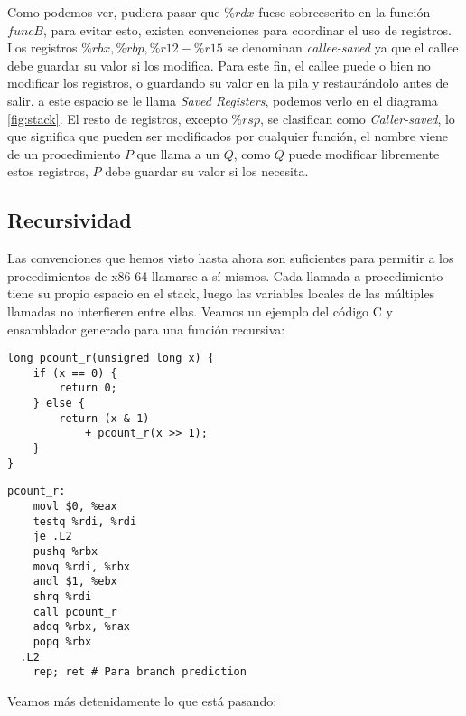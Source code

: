 Como podemos ver, pudiera pasar que $\%rdx$ fuese sobreescrito en la función $funcB$, para evitar esto,
existen convenciones para coordinar el uso de registros.
Los registros $\%rbx, \%rbp, \%r12-\%r15$ se denominan \textit{callee-saved} ya que el callee debe guardar su valor si los modifica.
Para este fin, el callee puede o bien no modificar los registros, o guardando su valor en la pila y restaurándolo antes de salir, a este espacio se le llama
\textit{Saved Registers}, podemos verlo en el diagrama \ref{fig:stack}.
El resto de registros, excepto $\%rsp$, se clasifican como \textit{Caller-saved}, lo que
significa que pueden ser modificados por cualquier función, el nombre viene de un procedimiento $P$ que llama a un $Q$, como
$Q$ puede modificar libremente estos registros, $P$ debe guardar su valor si los necesita.
\subsection{Recursividad}
Las convenciones que hemos visto hasta ahora son suficientes para permitir a los procedimientos de x86-64 llamarse a sí mismos.
Cada llamada a procedimiento tiene su propio espacio en el stack, luego las variables locales de las múltiples llamadas no interfieren entre ellas.
Veamos un ejemplo del código C y ensamblador generado para una función recursiva:
\begin{center}
	\begin{minipage}{0.45\textwidth}
		\begin{verbatim}
long pcount_r(unsigned long x) {
    if (x == 0) {
        return 0;
    } else {
        return (x & 1) 
            + pcount_r(x >> 1);
    }
}
\end{verbatim}
	\end{minipage}
	\begin{minipage}{0.45\textwidth}
		\begin{verbatim}
pcount_r:
    movl $0, %eax
    testq %rdi, %rdi
    je .L2
    pushq %rbx 
    movq %rdi, %rbx
    andl $1, %ebx
    shrq %rdi
    call pcount_r
    addq %rbx, %rax
    popq %rbx
  .L2
    rep; ret # Para branch prediction 
  \end{verbatim}
	\end{minipage}
\end{center}
Veamos más detenidamente lo que está pasando:
